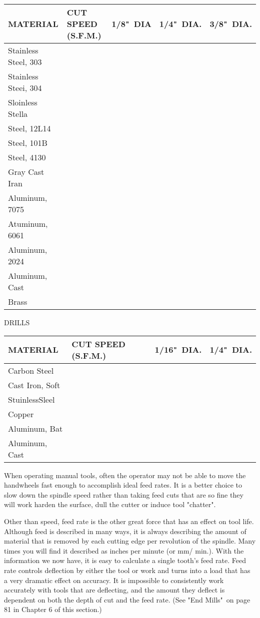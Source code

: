 \begin{tabular}{l l l l l}
\hline
MATERIAL & CUT SPEED (S.F.M.) & 1/8"\ DIA & 1/4"\ DIA. & 3/8"\ DIA. \\
\hline
Stainless Steel, 303\\				
Stainless Steei, 304\\				
Sloinless Stella\\				
Steel, 12L14\\				
Steel, 101B\\				
Steel, 4130\\				
Gray Cast Iran\\				
Aluminum, 7075\\				
Atuminum, 6061\\				
Aluminum, 2024\\				
Aluminum, Cast\\				
Brass\\				
\hline
\end{tabular}

\bigskip
DRILLS
\bigskip

\begin{tabular}{l l l l}
\hline
MATERIAL & CUT SPEED (S.F.M.) & 1/16"\ DIA. & 1/4"\ DIA. \\
\hline
Carbon Steel\\			
Cast Iron, Soft\\			
StuinlessSleel\\			
Copper\\			
Aluminum, Bat\\			
Aluminum, Cast\\			
\hline
\end{tabular}

\bigskip


When operating manual tools, often the operator may not be able to move the
handwheels fast enough to accomplish ideal feed rates. It is a better choice to
slow down the spindle speed rather than taking feed cuts that are so fine they
will work harden the surface, dull the cutter or induce tool "chatter".

Other than speed, feed rate is the other great force that has an effect on tool
life. Although feed is described in many ways, it is always describing the
amount of material that is removed by each cutting edge per revolution of the
spindle. Many times you will find it described as inches per minute (or mm/
min.). With the information we now have, it is easy to calculate a single
tooth's feed rate. Feed rate controls deflection by either the tool or work and
turns into a load that has a very dramatic effect on accuracy. It is impossible
to consistently work accurately with tools that are deflecting, and the amount
they deflect is dependent on both the depth of cut and the feed rate. (See "End
Mills"\ on page 81 in Chapter 6 of this section.)

\secup
